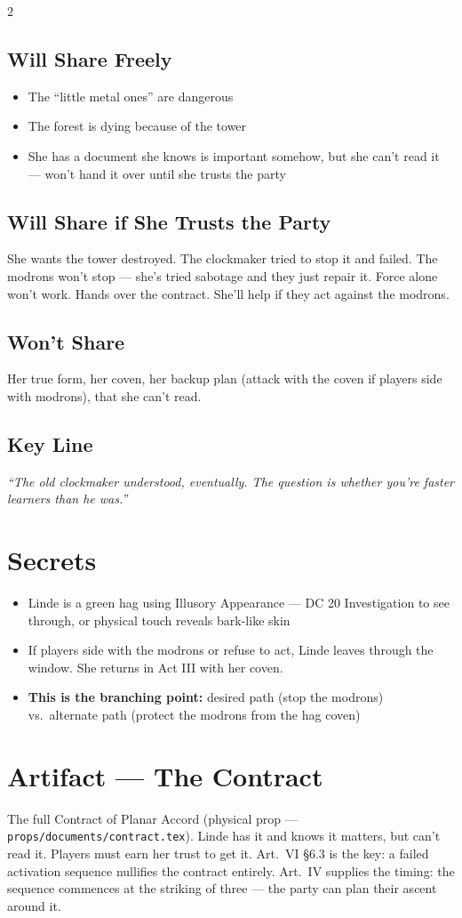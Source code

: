 \documentclass[10pt,letterpaper]{article}
\begin{document}
\begin{multicols}{2}
\subsection*{Will Share Freely}
\begin{itemize}
\item The ``little metal ones'' are dangerous
\item The forest is dying because of the tower
\item She has a document she knows is important somehow, but she can't read it --- won't hand it over until she trusts the party
\end{itemize}
\subsection*{Will Share if She Trusts the Party}
She wants the tower destroyed. The clockmaker tried to stop it and failed. The modrons won't stop --- she's tried sabotage and they just repair it. Force alone won't work. Hands over the contract. She'll help if they act against the modrons.
\subsection*{Won't Share}
Her true form, her coven, her backup plan (attack with the coven if players side with modrons), that she can't read.
\subsection*{Key Line}
\textit{``The old clockmaker understood, eventually. The question is whether you're faster learners than he was.''}

\section*{Secrets}
\begin{itemize}
\item Linde is a green hag using Illusory Appearance --- DC 20 Investigation to see through, or physical touch reveals bark-like skin
\item If players side with the modrons or refuse to act, Linde leaves through the window. She returns in Act III with her coven.
\item \textbf{This is the branching point:} desired path (stop the modrons) vs.\ alternate path (protect the modrons from the hag coven)
\end{itemize}

\section*{Artifact --- The Contract}
The full Contract of Planar Accord (physical prop --- \texttt{props/documents/contract.tex}). Linde has it and knows it matters, but can't read it. Players must earn her trust to get it. Art.\ VI \S6.3 is the key: a failed activation sequence nullifies the contract entirely. Art.\ IV supplies the timing: the sequence commences at the striking of three --- the party can plan their ascent around it.


\end{multicols}
\end{document}

